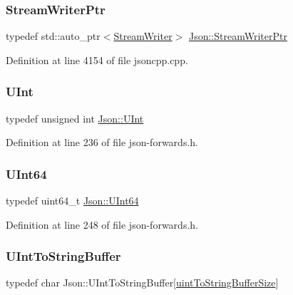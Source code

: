 \subsubsection{\texorpdfstring{Stream\+Writer\+Ptr}{StreamWriterPtr}}
{\footnotesize\ttfamily typedef std\+::auto\+\_\+ptr$<$\hyperlink{class_json_1_1_stream_writer}{Stream\+Writer}$>$ \hyperlink{namespace_json_a7132404aeebfc96d7c6ad2c66260afb5}{Json\+::\+Stream\+Writer\+Ptr}}



Definition at line 4154 of file jsoncpp.\+cpp.

\hypertarget{namespace_json_a800fb90eb6ee8d5d62b600c06f87f7d4}{}\label{namespace_json_a800fb90eb6ee8d5d62b600c06f87f7d4} 
\subsubsection{\texorpdfstring{U\+Int}{UInt}}
{\footnotesize\ttfamily typedef unsigned int \hyperlink{namespace_json_a800fb90eb6ee8d5d62b600c06f87f7d4}{Json\+::\+U\+Int}}



Definition at line 236 of file json-\/forwards.\+h.

\hypertarget{namespace_json_adf3fa5cb60c619e4f02315ad355e0ca1}{}\label{namespace_json_adf3fa5cb60c619e4f02315ad355e0ca1} 
\subsubsection{\texorpdfstring{U\+Int64}{UInt64}}
{\footnotesize\ttfamily typedef uint64\+\_\+t \hyperlink{namespace_json_adf3fa5cb60c619e4f02315ad355e0ca1}{Json\+::\+U\+Int64}}



Definition at line 248 of file json-\/forwards.\+h.

\hypertarget{namespace_json_a602bcf69c2042fb61c3b243cb16f04ca}{}\label{namespace_json_a602bcf69c2042fb61c3b243cb16f04ca} 
\subsubsection{\texorpdfstring{U\+Int\+To\+String\+Buffer}{UIntToStringBuffer}}
{\footnotesize\ttfamily typedef char Json\+::\+U\+Int\+To\+String\+Buffer\mbox{[}\hyperlink{namespace_json_aaadda4b3969b65336128f046fccf90a7ae4f2008c7919f20d81286121d1374424}{uint\+To\+String\+Buffer\+Size}\mbox{]}}



